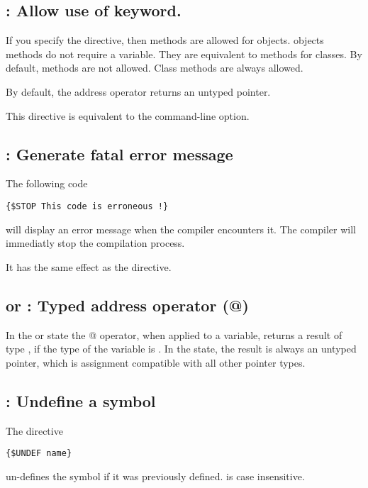\subsection{ : Allow use of  keyword.}

If you specify the  directive, then 
methods are allowed for objects.  objects methods do not require
a  variable. They are equivalent to  methods for
classes. By default,  methods are not allowed. Class methods
are always allowed.

By default, the address operator returns an untyped pointer.

This directive is equivalent to the  command-line option.

\subsection{ : Generate fatal error message}

The following code
\begin{verbatim}
{$STOP This code is erroneous !}
\end{verbatim}
will display an error message when the compiler encounters it.
The compiler will immediatly stop the compilation process.

It has the same effect as the  directive.

\subsection{ or  : Typed address operator (@)}

In the  or  state the @ operator,
when applied to a variable, returns a result of type , if the
type of the variable is . In the  state, the result is
always an untyped pointer, which is assignment compatible with all other
pointer types.

\subsection{ : Undefine a symbol}

The directive
\begin{verbatim}
{$UNDEF name}
\end{verbatim}
un-defines the symbol  if it was previously defined.
 is case insensitive.


